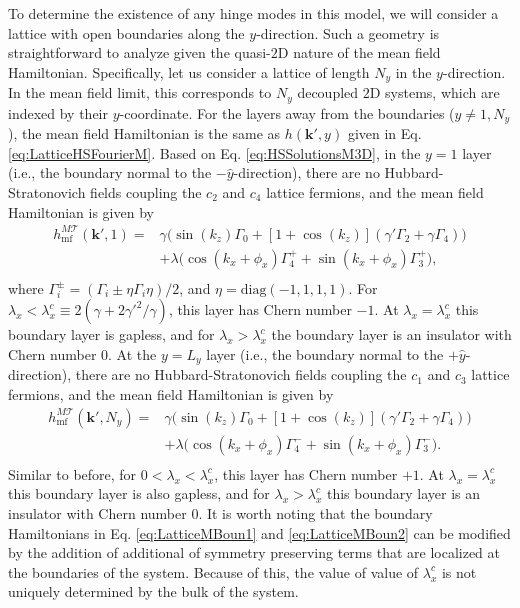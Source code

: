 \documentclass[prb,aps,twocolumn,groupaddress,floatfix]{revtex4-1}
\begin{document}
To determine the existence of any hinge modes in this model, we will consider a lattice with open boundaries along the $y$-direction. Such a geometry is straightforward to analyze given the quasi-$2$D nature of the mean field Hamiltonian. Specifically, let us consider a lattice of length $N_y$ in the $y$-direction. In the mean field limit, this corresponds to $N_y$ decoupled $2$D systems, which are indexed by their $y$-coordinate. For the layers away from the boundaries  ($y\neq 1,N_y$), the mean field Hamiltonian is the same as $h(\bm{k}',y)$ given in Eq. \ref{eq:LatticeHSFourierM}. Based on Eq. \ref{eq:HSSolutionsM3D}, in the $y = 1$ layer (i.e., the boundary normal to the $-\hat{y}$-direction), there are no Hubbard-Stratonovich fields coupling the $c_2$ and $c_4$ lattice fermions, and the mean field Hamiltonian is given by 
\begin{equation}
\begin{split}
h^{M\mathcal{T}}_{\text{mf}}(\bm{k}',1) =&\gamma \big(\sin(k_z )\Gamma_0 +[1+\cos(k_z )](\gamma'\Gamma_2+\gamma \Gamma_4) \big)\\
&+ \lambda \big(\cos(k_x+\phi_{x})\Gamma^+_4 + \sin(k_x + \phi_{x}) \Gamma^+_3\big),\\
\end{split}\label{eq:LatticeMBoun1}
\end{equation}
where $\Gamma^{\pm}_i = (\Gamma_i \pm \eta \Gamma_i \eta)/2$, and $\eta = \text{diag}(-1,1,1,1)$. For $\lambda_x < \lambda^c_x \equiv 2(\gamma + 2\gamma'^2/\gamma)$, this layer has Chern number $-1$. At $\lambda_x = \lambda^c_x$ this boundary layer is gapless, and for $\lambda_x > \lambda^c_x$ the boundary layer is an insulator with Chern number $0$. At the $y = L_y$ layer (i.e., the boundary normal to the $+\hat{y}$-direction), there are no Hubbard-Stratonovich fields coupling the $c_1$ and $c_3$ lattice fermions, and the mean field Hamiltonian is given by 
\begin{equation}
\begin{split}
h^{M\mathcal{T}}_{\text{mf}}(\bm{k}',N_y) =&\gamma \big(\sin(k_z )\Gamma_0 +[1+\cos(k_z )](\gamma'\Gamma_2+\gamma \Gamma_4) \big)\\
&+ \lambda \big(\cos(k_x+\phi_{x})\Gamma^-_4 + \sin(k_x + \phi_{x}) \Gamma^-_3\big).\\
\end{split}\label{eq:LatticeMBoun2}
\end{equation}
Similar to before, for $0<\lambda_x < \lambda_x^c$, this layer has Chern number $+1$. At $\lambda_x = \lambda_x^c$ this boundary layer is also gapless, and for $\lambda_x > \lambda_x^c$ this boundary layer is an insulator with Chern number $0$. It is worth noting that the boundary Hamiltonians in Eq. \ref{eq:LatticeMBoun1} and \ref{eq:LatticeMBoun2} can be modified by the addition of additional of symmetry preserving terms that are localized at the boundaries of the system. Because of this, the value of value of $\lambda^c_x$ is not uniquely determined by the bulk of the system. 
\end{document}
